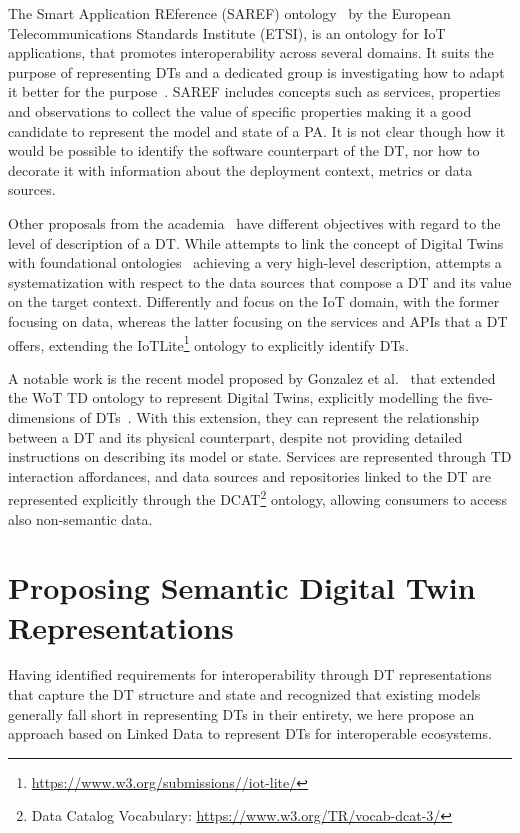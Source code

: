 The Smart Application REference (SAREF) ontology~\cite{saref} by the European Telecommunications Standards Institute (ETSI), is an ontology for IoT applications, that promotes interoperability across several domains. It suits the purpose of representing DTs and a dedicated group is investigating how to adapt it better for the purpose~\cite{etsi_dt_comm_requirements}. SAREF includes concepts such as services, properties and observations to collect the value of specific properties making it a good candidate to represent the model and state of a PA. It is not clear though how it would be possible to identify the software counterpart of the DT, nor how to decorate it with information about the deployment context, metrics or data sources.

Other proposals from the academia~\cite{barth_systematization_2020, barros2021requirements, singh_data_2021, steinmetz_internet_2018} have different objectives with regard to the level of description of a DT. While \cite{barros2021requirements} attempts to link the concept of Digital Twins with foundational ontologies~\cite{guizzardi2022ao} achieving a very high-level description, \cite{barth_systematization_2020} attempts a systematization with respect to the data sources that compose a DT and its value on the target context. Differently \cite{singh_data_2021} and \cite{steinmetz_internet_2018} focus on the IoT domain, with the former focusing on data, whereas the latter focusing on the services and APIs that a DT offers, extending the IoTLite\footnote{\url{https://www.w3.org/submissions//iot-lite/}} ontology to explicitly identify DTs.

A notable work is the recent model proposed by Gonzalez et al.~\cite{gonzalez-gerpe_wotdt_nodate} that extended the WoT TD ontology to represent Digital Twins, explicitly modelling the five-dimensions of DTs~\cite{QI20213}.
With this extension, they can represent the relationship between a DT and its physical counterpart, despite not providing detailed instructions on describing its model or state. Services are represented through TD interaction affordances, and data sources and repositories linked to the DT are represented explicitly through the DCAT\footnote{Data Catalog Vocabulary: \url{https://www.w3.org/TR/vocab-dcat-3/}} ontology, allowing consumers to access also non-semantic data.

\section{Proposing Semantic Digital Twin Representations}\label{sec:proposal}
Having identified requirements for interoperability through DT representations that capture the DT structure and state and recognized that existing models generally fall short in representing DTs in their entirety, we here propose an approach based on Linked Data to represent DTs for interoperable ecosystems.

